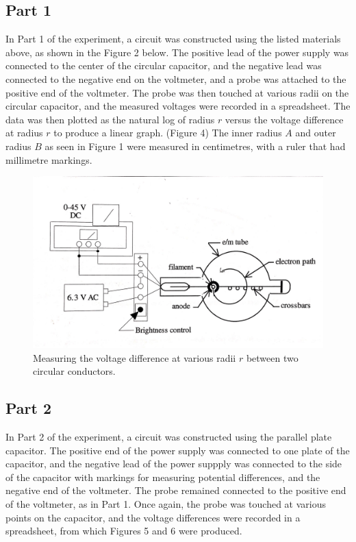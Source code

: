\documentclass[letterpaper]{article}
\begin{document}
\subsection{Part 1}
In Part 1 of the experiment, a circuit was constructed using the listed materials above, as shown in the Figure 2 below.
The positive lead of the power supply was connected to the center of the circular capacitor, and the negative lead
was connected to the negative end on the voltmeter, and a probe was attached to the positive end of the voltmeter.
The probe was then touched at various radii on the circular capacitor, and the measured voltages were recorded in
a spreadsheet. The data was then plotted as the natural log of radius $r$ versus the voltage difference at radius $r$
to produce a linear graph. (Figure 4) The inner radius $A$ and outer radius $B$ as seen in Figure 1 were measured in centimetres, with a ruler
that had millimetre markings.
\begin{figure}[H]
    \centering
    \includegraphics[width=.9\textwidth]{fig2.jpg}
    \caption{Measuring the voltage difference at various radii $r$ between two circular conductors. \cite{labmanual}}
\end{figure}


\subsection{Part 2}
In Part 2 of the experiment, a circuit was constructed using the parallel plate capacitor.
The positive end of the power supply was connected to one plate of the capacitor, and the negative
lead of the power suppply was connected to the side of the capacitor with markings for measuring potential
differences, and the negative end of the voltmeter. The probe remained connected to the positive end of the
voltmeter, as in Part 1. Once again, the probe was touched at various points on the capacitor, and the
voltage differences were recorded in a spreadsheet, from which Figures 5 and 6 were produced.
\end{document}
